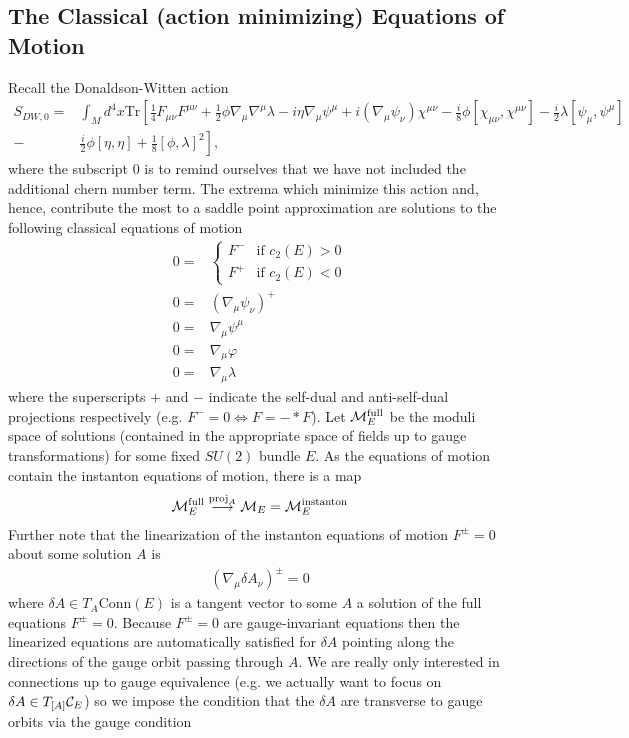 \documentclass[12pt, onecolumn]{article}
\begin{document}
\subsection{The Classical (action minimizing) Equations of Motion}
Recall the Donaldson-Witten action
\begin{align}
S_{DW,0}=&\int_{M}d^{4}x\text{Tr}\left[\frac{1}{4}F_{\mu \nu}F^{\mu \nu}+\frac{1}{2}\phi\nabla_{\mu}\nabla^{\mu}\lambda-i\eta \nabla_{\mu}\psi^{\mu}+i\left(\nabla_{\mu}\psi_{\nu} \right)\chi^{\mu \nu}-\frac{i}{8}\phi[\chi_{\mu \nu},\chi^{\mu \nu}]-\frac{i}{2}\lambda[\psi_{\mu},\psi^{\mu}] \right. \nonumber\\
-&\left.\frac{i}{2}\phi[\eta,\eta]+\frac{1}{8}[\phi,\lambda]^2\right],
\label{eqn_DWunmod}
\end{align}
where the subscript $0$ is to remind ourselves that we have not included the additional chern number term.  The extrema which minimize this action and, hence, contribute the most to a saddle point approximation are solutions to the following classical equations of motion
\begin{align*}
0=&\left\{
\begin{array}{cc}
F^{-} & \text{if $c_{2}(E)>0$}\\
F^{+} & \text{if $c_{2}(E)<0$}
\end{array}
\right.\\
0=&(\nabla_{\mu}\psi_{\nu})^{+}\\
0=&\nabla_{\mu}\psi^{\mu}\\
0=&\nabla_{\mu}\varphi\\
0=&\nabla_{\mu}\lambda
\end{align*}
where the superscripts $+$ and $-$ indicate the self-dual and anti-self-dual projections respectively (e.g. $F^{-}=0 \Leftrightarrow F=-*F$).  Let ${\cal M}^{\text{full}}_{E}$ be the moduli space of solutions (contained in the appropriate space of fields up to gauge transformations) for some fixed $SU(2)$ bundle $E$.  As the equations of motion contain the instanton equations of motion, there is a map
\begin{align*}
{\cal M}^{\text{full}}_{E} \overset{\text{proj}_{A}}{\longrightarrow} {\cal M}_{E}={\cal M}_{E}^{\text{instanton}}
\end{align*}
Further note that the linearization of the instanton equations of motion $F^{\pm}=0$ about some solution $A$ is
\begin{align*}
\left(\nabla_{\mu} \delta A_{\nu} \right)^{\pm}=0
\end{align*}
where $\delta A \in T_{A}\text{Conn}(E)$ is a tangent vector to some $A$ a solution of the full equations $F^{\pm}=0$.  Because $F^{\pm}=0$ are gauge-invariant equations then the linearized equations are automatically satisfied for $\delta A$ pointing along the directions of the gauge orbit passing through $A$.  We are really only interested in connections up to gauge equivalence (e.g. we actually want to focus on $\delta A \in T_{[A]}{\cal C}_{E}$) so we impose the condition that the $\delta A$ are transverse to gauge orbits via the gauge condition
\end{document}

